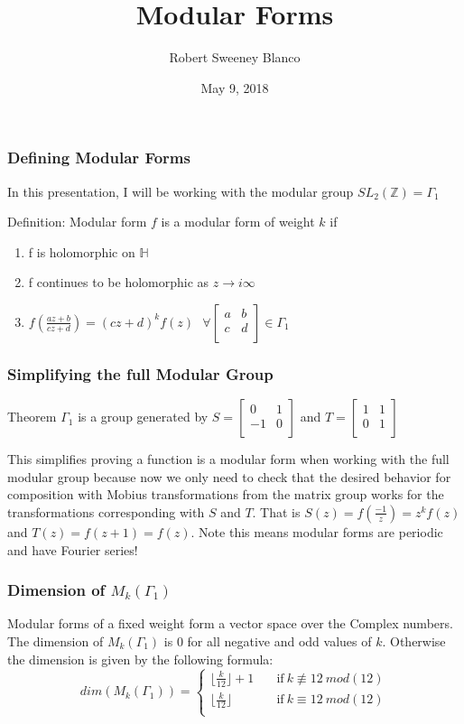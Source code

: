\documentclass{beamer}
\title{Modular Forms}
\author{Robert Sweeney Blanco}
\institute{Advisor: Brandon Williams}
\date{May 9, 2018}
\begin{document}
 
\frame{\titlepage}
 
\begin{frame}
\frametitle{Defining Modular Forms}
In this presentation, I will be working with the modular group $SL_2(\mathbb{Z}) = \Gamma_1$
\begin{block}{Definition: Modular form}
$f$ is a modular form of weight $k$ if 
\begin{enumerate}
\item  f is holomorphic on $\mathbb{H}$\\
\item f continues to be holomorphic as $z \longrightarrow i\infty$
\item $f(\frac{az+b}{cz+d}) = (cz+d)^k f(z) \  \ \ \forall \begin{bmatrix}
a & b \\
c & d \\
\end{bmatrix} 
\in \Gamma_1$
\end{enumerate}
\end{block}
\end{frame}

\begin{frame}
\frametitle{Simplifying the full Modular Group}
\begin{block}{Theorem}
$\Gamma_1$ is a group generated by $S = \begin{bmatrix}
0 & 1 \\
-1 & 0 \\
\end{bmatrix}$
and $T = \begin{bmatrix}
1 & 1 \\
0 & 1 \\
\end{bmatrix}$
\end{block}
This simplifies proving a function is a modular form when working with the full modular group because now we only need to check that the desired behavior for composition with Mobius transformations from the matrix group works for the transformations corresponding with $S$ and $T$. That is $S(z)=f(\frac{-1}{z}) = z^kf(z)$ and $T(z)=f(z+1)=f(z)$. Note this means modular forms are periodic and have Fourier series!
\end{frame}

\begin{frame}

\frametitle{Dimension of $M_k(\Gamma_1)$}
Modular forms of a fixed weight form a vector space over the Complex numbers. The dimension of $M_k(\Gamma_1)$ is $0$ for all negative and odd values of $k$. Otherwise the dimension is given by the following formula:
\[   
dim(M_k(\Gamma_1)) = 
     \begin{cases}
       \lfloor \frac{k}{12} \rfloor + 1 & \quad \text{if} \  k \not \equiv  12 \ mod(12) \\
       \lfloor \frac{k}{12} \rfloor & \quad \text{if} \  k \equiv  12 \ mod(12) \\
     \end{cases}
\]
\end{frame}
\end{document}
